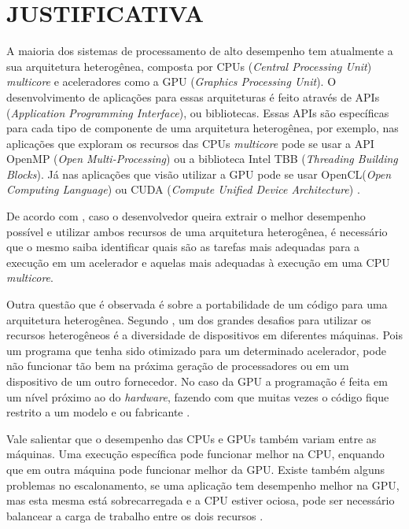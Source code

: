 
\chapter{JUSTIFICATIVA}
\label{chap:justificativa}

A maioria dos sistemas de processamento de alto desempenho tem atualmente a sua arquitetura heterogênea,
composta por CPUs (\textit{Central Processing Unit}) \textit{multicore} e aceleradores como a GPU (\textit{Graphics Processing Unit}).
O desenvolvimento de aplicações para essas arquiteturas é feito através de APIs (\textit{Application Programming Interface}), ou bibliotecas.
Essas APIs são específicas para cada tipo de componente de uma arquitetura heterogênea, por exemplo, nas aplicações que exploram os recursos
das CPUs \textit{multicore} pode se usar a API OpenMP (\textit{Open Multi-Processing}) \cite{openmp:2018} ou a biblioteca
Intel TBB \cite{inteltbb:2018} (\textit{Threading Building Blocks}).
Já nas aplicações que visão utilizar a GPU pode se usar OpenCL(\textit{Open Computing Language}) \cite{opencl:2018} ou CUDA (\textit{Compute Unified Device Architecture}) \cite{cuda:2018}.

De acordo com \cite{intrArqHete:2012}, caso o desenvolvedor queira extrair o melhor desempenho possível e utilizar ambos recursos de uma
arquitetura heterogênea, é necessário que o mesmo saiba identificar quais são as tarefas mais adequadas para a execução em um acelerador
e aquelas mais adequadas à execução em uma CPU \textit{multicore}.

Outra questão que é observada é sobre a portabilidade de um código para uma arquitetura heterogênea.
Segundo \cite{problemsArqHete:2013}, um dos grandes desafios para utilizar os recursos heterogêneos é a diversidade de dispositivos em diferentes máquinas.
Pois um programa que tenha sido otimizado para um determinado acelerador, pode não funcionar tão bem na próxima geração de processadores ou em um dispositivo de um outro fornecedor.
No caso da GPU a programação é feita em um nível próximo ao do \textit{hardware}, fazendo com que muitas vezes o código fique restrito a um modelo e ou fabricante \cite{pinto2011ambientes}.

Vale salientar que o desempenho das CPUs e GPUs também variam entre as máquinas.
Uma execução específica pode funcionar melhor na CPU, enquando que em outra máquina pode funcionar melhor da GPU.
Existe também alguns problemas no escalonamento, se uma aplicação tem desempenho melhor na GPU, mas esta mesma está sobrecarregada e a CPU estiver ociosa, pode ser necessário balancear
a carga de trabalho entre os dois recursos \cite{problemsArqHete:2013}.

